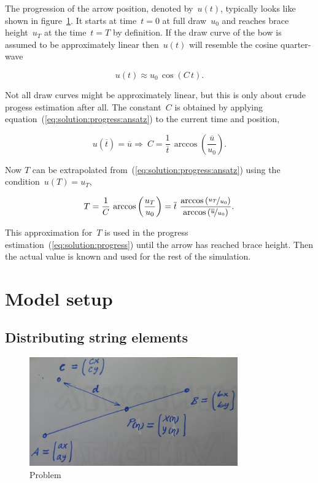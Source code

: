 The progression of the arrow position, denoted by~$u(t)$, typically looks like shown in figure~\ref{fig:solution:dynamic_progress}.
It starts at time~$t = 0$ at full draw~$u_0$ and reaches brace height~$u_T$ at the time~$t = T$ by definition.
If the draw curve of the bow is assumed to be approximately linear then~$u(t)$ will resemble the cosine quarter-wave

\begin{equation}
u(t) \approx u_{0}\,\cos{\left(C\,t\right)}.\label{eq:solution:progress:ansatz}
\end{equation}

Not all draw curves might be approximately linear, but this is only about crude progess estimation after all.
The constant~$C$ is obtained by applying equation~(\ref{eq:solution:progress:ansatz}) to the current time and position,

\begin{equation}
u(\overline{t}) = \overline{u} \Rightarrow \ C = \frac{1}{\overline{t}}\,\arccos{\left(\frac{\overline{u}}{u_0}\right)}.\label{eq:solution:progress:constant}
\end{equation}

Now $T$ can be extrapolated from~(\ref{eq:solution:progress:ansatz}) using the condition~$u(T) = u_T$,

\begin{align}
T = \frac{1}{C}\,\arccos{\left(\frac{u_T}{u_0}\right)} = \overline{t}\ \frac{\arccos{\left(\nicefrac{u_T}{u_0}\right)}}{\arccos{\left(\nicefrac{\overline{u}}{u_0}\right)}}.
\end{align}

This approximation for~$T$ is used in the progress estimation~(\ref{eq:solution:progress}) until the arrow has reached brace height. Then the actual value is known and used for the rest of the simulation.




\newpage
\section{Model setup}

\subsection{Distributing string elements}

\begin{figure}[h]
\centering
\includegraphics[width=0.8\textwidth]{figures/setup/line-distance}
\caption{Problem}
\label{fig:solution:dynamic_progress}
\end{figure}

